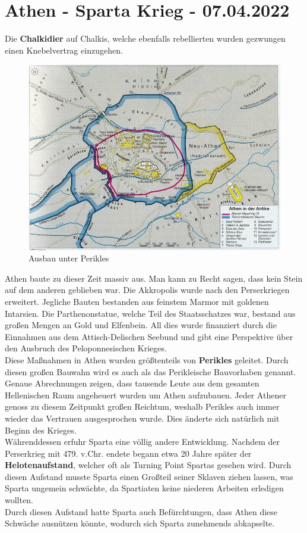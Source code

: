 \documentclass{article}
\begin{document}
	\section{Athen - Sparta Krieg - 07.04.2022}
	Die \textbf{Chalkidier} auf Chalkis, welche ebenfalls rebellierten wurden gezwungen einen Knebelvertrag einzugehen. \\
	\begin{figure}
	\includegraphics[scale=0.5]{Images/Athen_Antike.jpeg}
	\caption{Ausbau unter Perikles}
	\end{figure}
	Athen baute zu dieser Zeit massiv aus. Man kann zu Recht sagen, dass kein Stein auf dem anderen geblieben war. Die Akkropolis wurde nach den Perserkriegen erweitert. Jegliche Bauten bestanden aus feinstem Marmor mit goldenen Intarsien. Die Parthenonstatue, welche Teil des Staatsschatzes war, bestand aus großen Mengen an Gold und Elfenbein. All dies wurde finanziert durch die Einnahmen aus dem Attisch-Delischen Seebund und gibt eine Perspektive über den Ausbruch des Peloponnesischen Krieges. \\
	Diese Maßnahmen in Athen wurden größtenteils von \textbf{Perikles} geleitet. Durch diesen großen Bauwahn wird es auch als das Perikleische Bauvorhaben genannt. Genaue Abrechnungen zeigen, dass tausende Leute aus dem gesamten Hellenischen Raum angeheuert wurden um Athen aufzubauen. Jeder Athener genoss zu diesem Zeitpunkt großen Reichtum, weshalb Perikles auch immer wieder das Vertrauen ausgesprochen wurde. Dies änderte sich natürlich mit Beginn des Krieges. \\
	Währenddessen erfuhr Sparta eine völlig andere Entwicklung. Nachdem der Perserkrieg mit 479. v.Chr. endete begann etwa 20 Jahre später der \textbf{Helotenaufstand}, welcher oft als Turning Point Spartas gesehen wird. Durch diesen Aufstand musste Sparta einen Großteil seiner Sklaven ziehen lassen, was Sparta ungemein schwächte, da Spartiaten keine niederen Arbeiten erledigen wollten. \\
	Durch diesen Aufstand hatte Sparta auch Befürchtungen, dass Athen diese Schwäche ausnützen könnte, wodurch sich Sparta zunehmends abkapselte. \\
\end{document}
